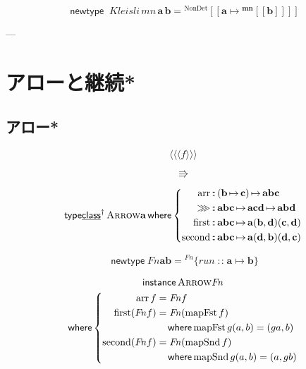 \documentclass[a5paper,twoside,fleqn,draft]{jsbook}
\def\[{\left[\!\left[}
\def\]{\right]\!\right]}
\newcommand{\mKeyword}[1]{\mathsf{#1}} %
\newcommand{\mKeywordUnderline}[1]{\text{\underline{\textsf{#1}}}} %
\newcommand{\mInstanceKeyword}{\mKeyword{instance}}
\newcommand{\mNewDataTypeKeyword}{\mKeyword{newtype}}
\newcommand{\mTypeClassKeyword}{\mKeyword{type}\mKeywordUnderline{class}}
\newcommand{\mWhereKeyword}{\mKeyword{where}}
\DeclareMathOperator{\mInstance}{\mInstanceKeyword}
\DeclareMathOperator{\mNewDataType}{\mNewDataTypeKeyword}
\DeclareMathOperator{\mTypeClassParametric}{\mTypeClassKeyword^\dagger}
\DeclareMathOperator{\mWhere}{\mWhereKeyword}
\DeclareMathOperator{\mIn}{{:\!:}}
\DeclareMathOperator{\mMapsTo}{\mapsto}
\newcommand{\mType}[1]{\mathbf{#1}}
\newcommand{\mA}{\mType{a}}
\newcommand{\mB}{\mType{b}}
\newcommand{\mGenericTypeAssemble}[2]{{}^{\mType{#1}}\[\mType{#2}\]}
\newcommand{\mTypeConstructor}[1]{\textit{#1}}
\newcommand{\mValueConstructor}[1]{\mathrm{#1}}
\newcommand{\mGenericValueAssemble}[2]{{}^\mValueConstructor{#1}\[#2\]}
\newcommand{\mArrowWith}[1]{\langle\!\langle\!\langle#1\rangle\!\rangle\!\rangle}
\newcommand{\mGenericTypeClass}[1]{\textsc{#1}} %
\newcommand{\mProj}[2]{#1\mMapsTo#2}
\begin{document}
\begin{equation}
  \mNewDataType\;
  \mTypeConstructor{Kleisli}\,\mTypeConstructor{mn}\,\mA\,\mB
  =\mGenericValueAssemble{NonDet}{\mA\mMapsTo\mGenericTypeAssemble{mn}{\mB}}
\end{equation}

---

\chapter{アローと継続*}
\section{アロー*}

$$
\mArrowWith{f}
$$

$$
\Rrightarrow
$$

\begin{equation}
\mTypeClassParametric\mGenericTypeClass{Arrow}{}\mType{a}
\mWhere\left\{
\begin{aligned}
  \mathrm{arr}&\mIn{}\mProj{(\mProj{\mType{b}}{\mType{c}})}{\mType{a}\mType{b}\mType{c}}\\
  \ggg&\mIn\mProj{\mType{a}\mType{b}\mType{c}}{\mProj{\mType{a}\mType{c}\mType{d}}{\mType{a}\mType{b}\mType{d}}}\\
  \mathrm{first}&\mIn\mProj{\mType{a}\mType{b}\mType{c}}{\mType{a}(\mType{b},\mType{d})(\mType{c},\mType{d})}\\
  \mathrm{second}&\mIn\mProj{\mType{a}\mType{b}\mType{c}}{\mType{a}(\mType{d},\mType{b})(\mType{d},\mType{c})}
\end{aligned}
\right.
\end{equation}

\begin{equation}
\mNewDataType\mathit{Fn}\mType{a}\mType{b}={}^\mathit{Fn}\{\mathit{run}\mIn\mProj{\mType{a}}{\mType{b}}\}
\end{equation}

\begin{multline}
  \mInstance\mGenericTypeClass{Arrow}{}\mathit{Fn}\\
  \mWhere\left\{
  \begin{aligned}
    \mathop{\mathrm{arr}} f&=\mathit{Fn} f\\
    \mathop{\mathrm{first}} (\mathit{Fn} f)&=\mathit{Fn}(\mathop{\mathrm{mapFst}} f)\\
      &\quad\mWhere\mathop{\mathrm{mapFst}}g(a,b)=(ga,b)\\
    \mathop{\mathrm{second}} (\mathit{Fn} f)&=\mathit{Fn}(\mathop{\mathrm{mapSnd}} f)\\
      &\quad\mWhere\mathop{\mathrm{mapSnd}} g(a,b)=(a,gb)
  \end{aligned}
  \right.
\end{multline}
\end{document}

